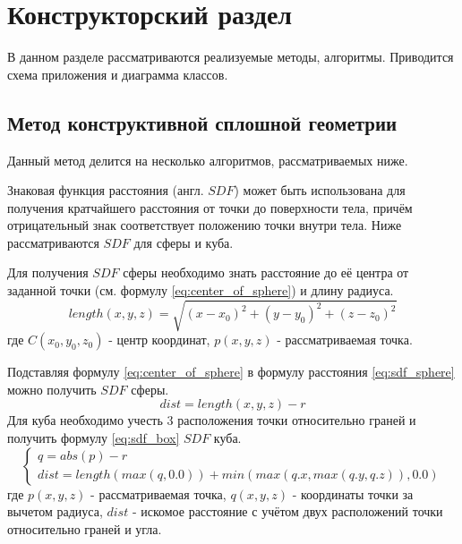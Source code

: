 \chapter{Конструкторский раздел}
\label{cha:design}

В данном разделе рассматриваются реализуемые методы, алгоритмы. Приводится
схема приложения и диаграмма классов.

\section{Метод конструктивной сплошной геометрии}
Данный метод делится на несколько алгоритмов, рассматриваемых ниже.

Знаковая функция расстояния (англ. $SDF$) может быть использована для получения кратчайшего 
расстояния от точки до поверхности тела, причём отрицательный знак соответствует положению точки внутри тела.
Ниже рассматриваются $SDF$ для сферы и куба.

Для получения $SDF$ сферы необходимо знать расстояние до её центра от заданной точки (см. формулу \ref{eq:center_of_sphere})
и длину радиуса.
\begin{equation} \label{eq:center_of_sphere}
  length(x,y,z) = \sqrt{(x - x_0)^2 + (y - y_0)^2 + (z - z_0)^2}
\end{equation}
где $C(x_0, y_0, z_0)$ - центр координат,
$p(x, y, z)$ - рассматриваемая точка.  

Подставляя формулу \ref{eq:center_of_sphere} в формулу расстояния \ref{eq:sdf_sphere} можно получить
$SDF$ сферы.
\begin{equation} \label{eq:sdf_sphere}
  dist = length(x, y, z) - r
\end{equation}
Для куба необходимо учесть 3 расположения точки относительно граней и 
получить формулу \ref{eq:sdf_box} $SDF$ куба.
\begin{equation} \label{eq:sdf_box}
  \begin{cases}
    q = abs(p) - r  \\
    dist = length(max(q, 0.0)) + min(max(q.x, max(q.y,q.z)), 0.0)
  \end{cases}
\end{equation}
где $p(x, y, z)$ - рассматриваемая точка,
$q(x, y, z)$ - координаты точки за вычетом радиуса,
$dist$ - искомое расстояние с учётом двух расположений точки относительно граней и угла.


